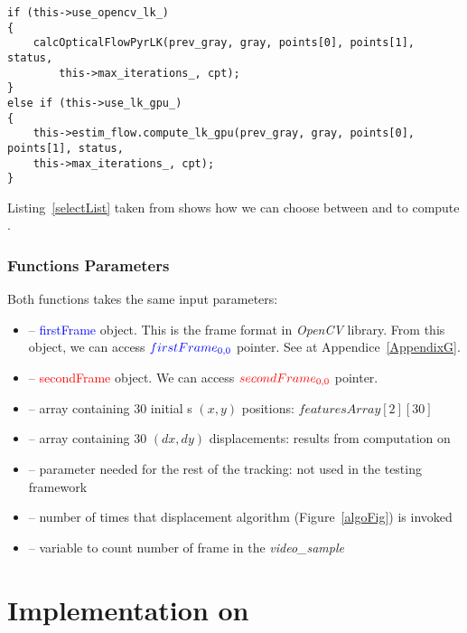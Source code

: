 \begin{lstlisting}
if (this->use_opencv_lk_)
{
	calcOpticalFlowPyrLK(prev_gray, gray, points[0], points[1], status,
        this->max_iterations_, cpt);
}
else if (this->use_lk_gpu_)
{
	this->estim_flow.compute_lk_gpu(prev_gray, gray, points[0], points[1], status,
	this->max_iterations_, cpt);
}
\end{lstlisting}


Listing~\ref{selectList} taken from  shows how we can choose between  and  to compute \flow.


\subsubsection{Functions Parameters}\label{fctParams}

Both functions takes the same input parameters:
\begin{itemize}
	\item {} -- \textcolor{blue}{firstFrame}  object. This is the frame format in \emph{OpenCV} library. From this object, we can access $\textcolor{blue}{firstFrame_{0,0}}$ pointer. See  at Appendice~\ref{AppendixG}.
	\item {} -- \textcolor{red}{secondFrame}  object. We can access $\textcolor{red}{secondFrame_{0,0}}$ pointer.
	\item {} -- array containing 30 initial \feat{}s $(x,y)$ positions:  $featuresArray[2][30]$
	\item {} -- array containing 30 $(dx, dy)$ displacements: results from \flow{} computation on \vc
	\item {} -- parameter needed for the rest of the tracking: not used in the testing framework
	\item {} -- number of times that displacement algorithm (Figure~\ref{algoFig}) is invoked
	\item {} -- variable to count number of frame in the \emph{video\_sample}
\end{itemize}


\section{Implementation on \vc}

